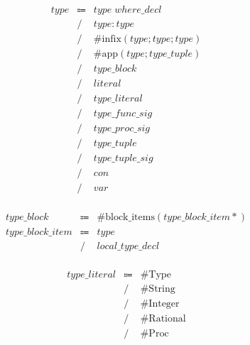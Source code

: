 \begin{align*}
    \begin{array}{rcll}
        \mathit{type}
        &\Coloneq &\mathit{type}\; \mathit{where\_decl} \\
        &\mathrel{/} &\mathit{type}: \mathit{type} \\
        &\mathrel{/} &\mathrm{\#infix}(\mathit{type}; \mathit{type}; \mathit{type}) \\
        &\mathrel{/} &\mathrm{\#app}(\mathit{type}; \mathit{type\_tuple}) \\
        &\mathrel{/} &\mathit{type\_block} \\
        &\mathrel{/} &\mathit{literal} \\
        &\mathrel{/} &\mathit{type\_literal} \\
        &\mathrel{/} &\mathit{type\_func\_sig} \\
        &\mathrel{/} &\mathit{type\_proc\_sig} \\
        &\mathrel{/} &\mathit{type\_tuple} \\
        &\mathrel{/} &\mathit{type\_tuple\_sig} \\
        &\mathrel{/} &\mathit{con} \\
        &\mathrel{/} &\mathit{var}
    \end{array}
\end{align*}

\begin{align*}
    \begin{array}{rcll}
        \mathit{type\_block}
        &\Coloneq &\mathrm{\#block\_items}(\mathit{type\_block\_item}{*}) \\
        \mathit{type\_block\_item}
        &\Coloneq &\mathit{type} \\
        &\mathrel{/} &\mathit{local\_type\_decl}
    \end{array}
\end{align*}

\begin{align*}
    \begin{array}{rcll}
        \mathit{type\_literal}
        &\Coloneq &\mathrm{\#Type} \\
        &\mathrel{/} &\mathrm{\#String} \\
        &\mathrel{/} &\mathrm{\#Integer} \\
        &\mathrel{/} &\mathrm{\#Rational} \\
        &\mathrel{/} &\mathrm{\#Proc}
    \end{array}
\end{align*}

